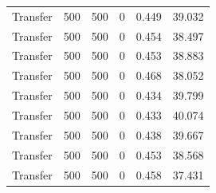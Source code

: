 \begin{table}
\begin{tabular}{lrrrrr}
Transfer & 500 & 500 & 0 & 0.449 & 39.032 \\
Transfer & 500 & 500 & 0 & 0.454 & 38.497 \\
Transfer & 500 & 500 & 0 & 0.453 & 38.883 \\
Transfer & 500 & 500 & 0 & 0.468 & 38.052 \\
Transfer & 500 & 500 & 0 & 0.434 & 39.799 \\
Transfer & 500 & 500 & 0 & 0.433 & 40.074 \\
Transfer & 500 & 500 & 0 & 0.438 & 39.667 \\
Transfer & 500 & 500 & 0 & 0.453 & 38.568 \\
Transfer & 500 & 500 & 0 & 0.458 & 37.431 \\
\bottomrule
\end{tabular}
\end{table}
